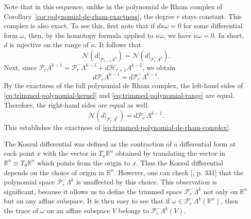 {Note that in this sequence, unlike in the polynomial de Rham complex of Corollary~\ref{cor:polynomial-de-rham-exactness}, the degree $r$ stays constant. This complex is also exact. To see this, first note that if $d\kappa\omega=0$ for some differential form $\omega$, then, by the homotopy formula applied to $\kappa\omega$, we have $\kappa\omega=0$. In short, $d$ is injective on the range of $\kappa$. It follows that}
\begin{equation}\label{eq:trimmed-polynomial-kernel}
\mathcal N(d|_{\mathcal P_{r-1}\Lambda^k})=\mathcal N(d|_{\mathcal P_r^-\Lambda^k}).
\end{equation}
{Next, since $\mathcal P_r\Lambda^{k-1}=\mathcal P_r^-\Lambda^{k-1}+d\mathcal H_{r+1}\Lambda^{k-2}$, we obtain}
\begin{equation}\label{eq:trimmed-polynomial-range}
d\mathcal P_r\Lambda^{k-1}=d\mathcal P_r^-\Lambda^{k-1}.
\end{equation}
{By the exactness of the full polynomial de Rham complex, the left-hand sides of \eqref{eq:trimmed-polynomial-kernel} and \eqref{eq:trimmed-polynomial-range} are equal. Therefore, the right-hand sides are equal as well:}
\[
\mathcal N(d|_{\mathcal P_r^-\Lambda^k})=d\mathcal P_r^-\Lambda^{k-1}.
\]
{This establishes the exactness of \eqref{eq:trimmed-polynomial-de-rham-complex}.}

\begin{Remark}\label{rem:trimmed-origin-independence}
{The Koszul differential was defined as the contraction of a differential form at each point $x$ with the vector in $T_x\mathbb R^n$ obtained by translating the vector in $\mathbb R^n\equiv T_0\mathbb R^n$ which points from the origin to $x$. Thus the Koszul differential depends on the choice of origin in $\mathbb R^n$. However, one can check [, p. 331] that the polynomial space $\mathcal P_r^-\Lambda^k$ is unaffected by this choice. This observation is significant, because it allows us to define the trimmed space $\mathcal P_r^-\Lambda^k$ not only on $\mathbb R^n$ but on any affine subspace. It is then easy to see that if $\omega\in\mathcal P_r^-\Lambda^k(\mathbb R^n)$, then the trace of $\omega$ on an affine subspace $V$ belongs to $\mathcal P_r^-\Lambda^k(V)$.}
\end{Remark}

